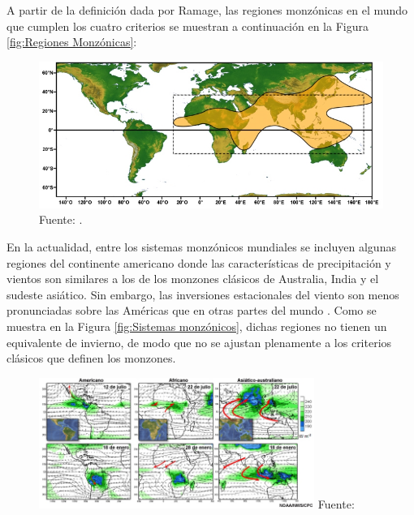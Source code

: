 \documentclass[12pt]{article}
\begin{document}
A partir de la definición dada por Ramage, las regiones monzónicas en el mundo que cumplen los cuatro criterios se muestran a continuación en la Figura  \ref{fig:Regiones Monzónicas}:

\begin{figure}[H]
	\begin{center}
 		\includegraphics[width = 1\textwidth]{Imagenes/monsoonregions.jpg}
 		Fuente: \cite{COMET}.	
	\end{center} 
\end{figure}

En la actualidad, entre los sistemas monzónicos mundiales se incluyen algunas regiones del continente americano donde las características de precipitación y vientos son similares a los de los monzones clásicos de Australia, India y el sudeste asiático. Sin embargo, las inversiones estacionales del viento son menos pronunciadas sobre las Américas que en otras partes del mundo \cite{CPC} . Como se muestra en la Figura \ref{fig:Sistemas monzónicos}, dichas regiones no tienen un equivalente de invierno, de modo que no se ajustan plenamente a los criterios clásicos que definen los monzones.

\begin{figure}[H]
	\begin{center}
 		\includegraphics[width = 0.8\textwidth]{Imagenes/global_monsoons.jpg}
 		Fuente: \cite{COMET} 
	\end{center} 
\end{figure}
\end{document}
